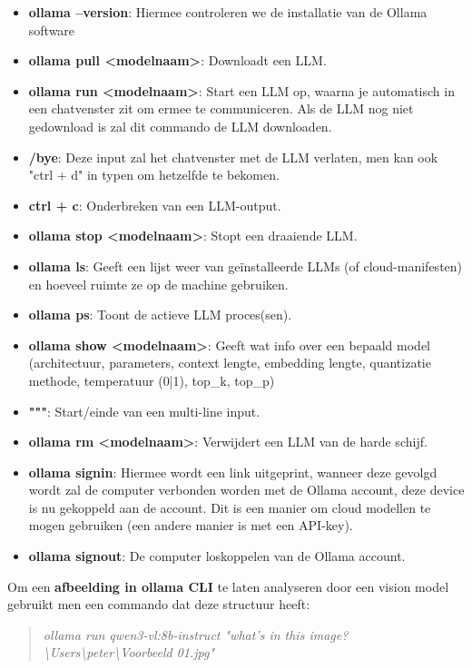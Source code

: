 \begin{itemize}
    \item \textbf{ollama --version}: Hiermee controleren we de installatie van de Ollama software
    \item \textbf{ollama pull <modelnaam>}: Downloadt een LLM.
    \item \textbf{ollama run <modelnaam>}: Start een LLM op, waarna je automatisch in een chatvenster zit om ermee te communiceren. Als de LLM nog niet gedownload is zal dit commando de LLM downloaden.
    \item \textbf{/bye}: Deze input zal het chatvenster met de LLM verlaten, men kan ook "ctrl + d" in typen om hetzelfde te bekomen.
    \item \textbf{ctrl + c}: Onderbreken van een LLM-output.
    \item \textbf{ollama stop <modelnaam>}: Stopt een draaiende LLM.
    \item \textbf{ollama ls}: Geeft een lijst weer van geïnstalleerde LLMs (of cloud-manifesten) en hoeveel ruimte ze op de machine gebruiken.
    \item \textbf{ollama ps}: Toont de actieve LLM proces(sen).
    \item \textbf{ollama show <modelnaam>}: Geeft wat info over een bepaald model (architectuur, parameters, context lengte, embedding lengte, quantizatie methode, temperatuur (0|1), top\_k, top\_p)
    \item \textbf{"""}: Start/einde van een multi-line input.
     \item \textbf{ollama rm <modelnaam>}: Verwijdert een LLM van de harde schijf.
     \item \textbf{ollama signin}: Hiermee wordt een link uitgeprint, wanneer deze gevolgd wordt zal de computer verbonden worden met de Ollama account, deze device is nu gekoppeld aan de account. Dit is een manier om cloud modellen te mogen gebruiken (een andere manier is met een API-key).
     \item \textbf{ollama signout}: De computer loskoppelen van de Ollama account.
\end{itemize}

Om een \textbf{afbeelding in ollama CLI} te laten analyseren door een vision model gebruikt men een commando dat deze structuur heeft:

\begin{quote}
    \textit{ollama run qwen3-vl:8b-instruct "what's in this image? \textbackslash Users\textbackslash peter\textbackslash Voorbeeld 01.jpg"}
\end{quote}

